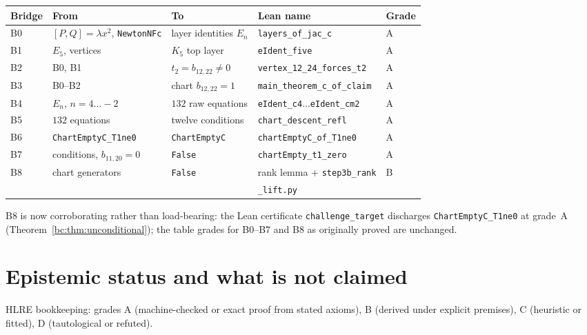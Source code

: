 \documentclass[a4paper,11pt]{article}
\theoremstyle{plain}
\theoremstyle{definition}
\theoremstyle{remark}
\begin{document}
{\small
\begin{center}
\begin{tabular}{lllll}
\toprule
\textbf{Bridge} & \textbf{From} & \textbf{To} & \textbf{Lean name} & \textbf{Grade} \\
\midrule
B0 & $[P,Q]=\lambda x^2$, \texttt{NewtonNFc} & layer identities $E_n$ & \texttt{layers\_of\_jac\_c} & A \\
B1 & $E_5$, vertices & $K_5$ top layer & \texttt{eIdent\_five} & A \\
B2 & B0, B1 & $t_2=b_{12,22}\ne0$ & \texttt{vertex\_12\_24\_forces\_t2} & A \\
B3 & B0--B2 & chart $b_{12,22}=1$ & \texttt{main\_theorem\_c\_of\_claim} & A \\
B4 & $E_n$, $n=4\dots-2$ & $132$ raw equations & \texttt{eIdent\_c4}$\dots$\texttt{eIdent\_cm2} & A \\
B5 & $132$ equations & twelve conditions & \texttt{chart\_descent\_refl} & A \\
B6 & \texttt{ChartEmptyC\_T1ne0} & \texttt{ChartEmptyC} & \texttt{chartEmptyC\_of\_T1ne0} & A \\
B7 & conditions, $b_{11,20}=0$ & \texttt{False} & \texttt{chartEmpty\_t1\_zero} & A \\
B8 & chart generators & \texttt{False} & rank lemma + \texttt{step3b\_rank} & B \\
& & & \texttt{\_lift.py} & \\
\bottomrule
\end{tabular}
\end{center}
}
\label{bc:tab:bridges}

B8 is now corroborating rather than load-bearing: the Lean certificate \texttt{challenge\_target} discharges \texttt{ChartEmptyC\_T1ne0} at grade~A (Theorem~\ref{bc:thm:unconditional}); the table grades for B0--B7 and B8 as originally proved are unchanged.

\section{Epistemic status and what is not claimed}\label{bc:sec:epistemic}

HLRE bookkeeping: grades A (machine-checked or exact proof from stated axioms), B (derived under explicit premises), C (heuristic or fitted), D (tautological or refuted).
\end{document}
